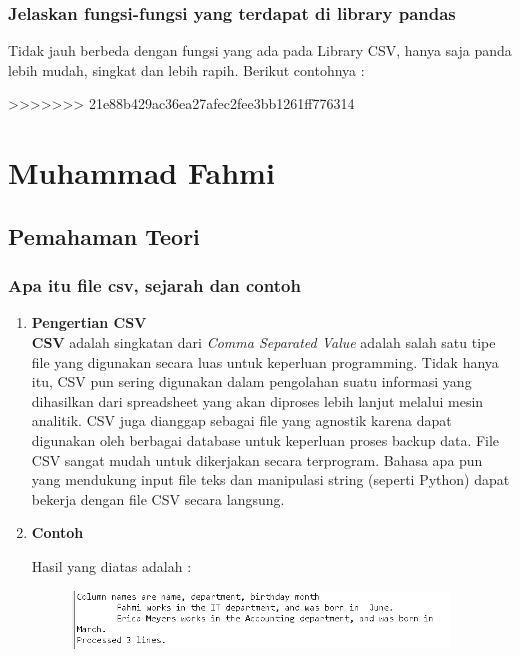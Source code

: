 \subsubsection{Jelaskan fungsi-fungsi yang terdapat di library pandas}
Tidak jauh berbeda dengan fungsi yang ada pada Library CSV, hanya saja panda lebih mudah, singkat dan lebih rapih. Berikut contohnya :

>>>>>>> 21e88b429ac36ea27afec2fee3bb1261ff776314


\section{Muhammad Fahmi}

\subsection{Pemahaman Teori}

\subsubsection{Apa itu file csv, sejarah dan contoh}
\begin{enumerate}
	\item \textbf{Pengertian CSV} \\
	\textbf{CSV} adalah singkatan dari \textit{Comma Separated Value} adalah salah satu tipe file yang digunakan secara luas untuk keperluan programming. Tidak hanya itu, CSV pun sering digunakan dalam pengolahan suatu informasi yang dihasilkan dari spreadsheet yang akan diproses lebih lanjut melalui mesin analitik. CSV juga dianggap sebagai file yang agnostik karena dapat digunakan oleh berbagai database untuk keperluan proses backup data. File CSV sangat mudah untuk dikerjakan secara terprogram. Bahasa apa pun yang mendukung input file teks dan manipulasi string (seperti Python) dapat bekerja dengan file CSV secara langsung.
	
	\item \textbf{Contoh}
	
	
	Hasil yang diatas adalah : 
	\begin{figure}[H]
		\includegraphics[width=10cm]{figures/fahmi/7.png}
		\centering
	\end{figure}
	
	
\end{enumerate}

